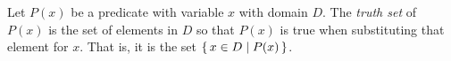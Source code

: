 \guard



\begin{defn}
\label{defn:truthSet}
  Let $P(x)$ be a predicate with variable $x$ with domain $D$.
  The \emph{truth set} of $P(x)$ is the set of elements in $D$ so that $P(x)$ is true when substituting that element for $x$.
  That is, it is the set $\left\{\, x \in D\mid P(x) \,\right\}$.
\end{defn}
